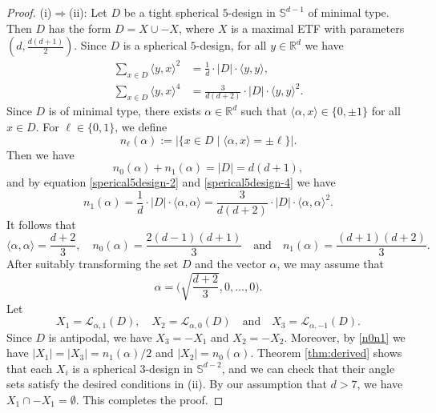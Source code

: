 \documentclass[11pt]{article}
\theoremstyle{definition}
\theoremstyle{remark}
\begin{document}
\begin{proof}
(i)$\Rightarrow$(ii):
Let $D$ be a tight spherical $5$-design in $\mathbb{S}^{d-1}$ of minimal type. Then $D$ has the form $D=X\cup -X$, where $X$ is a maximal ETF with parameters $(d, \frac{d(d+1)}{2})$. 
Since $D$ is a spherical $5$-design, for all $y\in\mathbb{R}^d$ we have \cite{Ven01,BMV04}
\begin{subequations}
\begin{align}
\sum_{x\in D}\langle y,x \rangle^2&=\frac{1}{d}\cdot |D|\cdot \langle y,y \rangle,\label{sperical5design-2} \\
\sum_{x\in D}\langle y,x \rangle^4&=\frac{3}{d(d+2)}\cdot |D|\cdot\langle y,y \rangle^2 \label{sperical5design-4}.
\end{align}
\end{subequations}
Since $D$ is of minimal type, there exists  $ \alpha\in \mathbb{R}^d$ such that $\langle  \alpha, x\rangle\in \{0,\pm1\}$ for all $x\in D$.
For $\ell\in\{0,1\}$, we define 
\begin{equation*}
n_\ell(\alpha):=|\{x\in D \mid \langle \alpha,x\rangle=\pm \ell\}|.
\end{equation*}
Then we have
\begin{equation}\label{sum}
n_0(\alpha)+n_1(\alpha)=|D|=d(d+1),
\end{equation}
and by equation \eqref{sperical5design-2} and \eqref{sperical5design-4} we have
\begin{equation*}
n_1(\alpha)
=\frac{1}{d}\cdot |D|\cdot \langle \alpha,\alpha \rangle
=\frac{3}{d(d+2)}\cdot |D|\cdot\langle \alpha,\alpha \rangle^2.
\end{equation*}
It follows that  
\begin{equation}\label{n0n1}
\langle \alpha,\alpha\rangle=\frac{d+2}{3}, \quad n_0( \alpha)=\frac{2(d-1)(d+1)}{3}\quad\text{and}\quad n_1( \alpha)=\frac{(d+1)(d+2)}{3}. 
\end{equation} 
After suitably transforming the set $D$ and the vector $\alpha$, we may assume that 
\begin{equation*}
\alpha=\bigg(\sqrt{\frac{d+2}{3}},0,\ldots,0\bigg).	
\end{equation*}
Let 
\begin{equation*}
X_1=\mathcal{L}_{\alpha,1}(D),\quad X_2=\mathcal{L}_{\alpha,0}(D)\quad\text{and}\quad X_3=\mathcal{L}_{\alpha,-1}(D).
\end{equation*}
Since $D$ is antipodal, we have $X_3=-X_1$ and $X_2=-X_2$. Moreover, by \eqref{n0n1} we have $|X_1|=|X_3|=n_1( \alpha)/2$ and $|X_2|= n_0( \alpha)$. Theorem \ref{thm:derived} shows that each $X_i$ is a spherical $3$-design in $\mathbb{S}^{d-2}$, and we can check that their angle sets satisfy the desired conditions in (ii). By our assumption that $d>7$, we have $X_1\cap -X_1=\emptyset$. This completes the proof. 


\end{proof}
\end{document}
